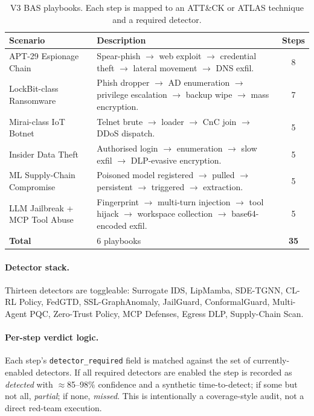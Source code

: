 \documentclass[11pt,a4paper]{article}
\begin{document}
\begin{table}[H]
\centering
\caption{V3 BAS playbooks. Each step is mapped to an ATT\&CK or
  ATLAS technique and a required detector.}
\label{tab:bas_scenarios}
\small
\begin{tabular}{@{}lp{6.7cm}c@{}}
\toprule
\textbf{Scenario} & \textbf{Description} & \textbf{Steps} \\
\midrule
APT-29 Espionage Chain        & Spear-phish $\to$ web exploit $\to$ credential theft $\to$ lateral movement $\to$ DNS exfil. & 8 \\
LockBit-class Ransomware      & Phish dropper $\to$ AD enumeration $\to$ privilege escalation $\to$ backup wipe $\to$ mass encryption. & 7 \\
Mirai-class IoT Botnet        & Telnet brute $\to$ loader $\to$ CnC join $\to$ DDoS dispatch. & 5 \\
Insider Data Theft            & Authorised login $\to$ enumeration $\to$ slow exfil $\to$ DLP-evasive encryption. & 5 \\
ML Supply-Chain Compromise    & Poisoned model registered $\to$ pulled $\to$ persistent $\to$ triggered $\to$ extraction. & 5 \\
LLM Jailbreak + MCP Tool Abuse& Fingerprint $\to$ multi-turn injection $\to$ tool hijack $\to$ workspace collection $\to$ base64-encoded exfil. & 5 \\
\midrule
\textbf{Total}                & 6 playbooks                            & \textbf{35} \\
\bottomrule
\end{tabular}
\end{table}

\paragraph{Detector stack.}  Thirteen detectors are toggleable:
Surrogate IDS, LipMamba, SDE-TGNN, CL-RL Policy, FedGTD,
SSL-GraphAnomaly, JailGuard, ConformalGuard, Multi-Agent PQC,
Zero-Trust Policy, MCP Defenses, Egress DLP, Supply-Chain Scan.

\paragraph{Per-step verdict logic.}  Each step's \texttt{detector\_required}
field is matched against the set of currently-enabled detectors.
If all required detectors are enabled the step is recorded as
\emph{detected} with $\approx$85--98\% confidence and a synthetic
time-to-detect; if some but not all, \emph{partial}; if none,
\emph{missed}.  This is intentionally a coverage-style audit, not a
direct red-team execution.
\end{document}
